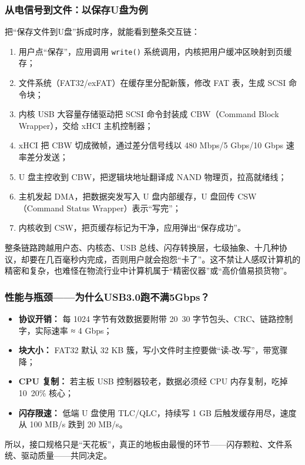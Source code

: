 \subsubsection{从电信号到文件：以保存U盘为例}

把“保存文件到U盘”拆成时序，就能看到整条交互链：
\begin{enumerate}
\item 用户点“保存”，应用调用 \texttt{write()} 系统调用，内核把用户缓冲区映射到页缓存；
\item 文件系统（FAT32/exFAT）在缓存里分配新簇，修改 FAT 表，生成 SCSI 命令块；
\item 内核 USB 大容量存储驱动把 SCSI 命令封装成 CBW（Command Block Wrapper），交给 xHCI 主机控制器；
\item xHCI 把 CBW 切成微帧，通过差分信号线以 480 Mbps/5 Gbps/10 Gbps 速率差分发送；
\item U 盘主控收到 CBW，把逻辑块地址翻译成 NAND 物理页，拉高就绪线；
\item 主机发起 DMA，把数据突发写入 U 盘内部缓存，U 盘回传 CSW（Command Status Wrapper）表示“写完”；
\item 内核收到 CSW，把页缓存标记为干净，应用弹出“保存成功”。
\end{enumerate}
整条链路跨越用户态、内核态、USB 总线、闪存转换层，七级抽象、十几种协议，却要在几百毫秒内完成，否则用户就会抱怨“卡了”。这不禁让人感叹计算机的精密和复杂，也难怪在物流行业中计算机属于“精密仪器”或“高价值易损货物”。

\subsubsection{性能与瓶颈——为什么USB3.0跑不满5Gbps？}
\begin{itemize}
\item \textbf{协议开销：} 每 1024 字节有效数据要附带 20~30 字节包头、CRC、链路控制字，实际速率 ≈ 4 Gbps；
\item \textbf{块大小：} FAT32 默认 32 KB 簇，写小文件时主控要做“读-改-写”，带宽骤降；
\item \textbf{CPU 复制：} 若主板 USB 控制器较老，数据必须经 CPU 内存复制，吃掉 10~20\% 核心；
\item \textbf{闪存限速：} 低端 U 盘使用 TLC/QLC，持续写 1 GB 后触发缓存用尽，速度从 100 MB/s 跌到 20 MB/s。
\end{itemize}
所以，接口规格只是“天花板”，真正的地板由最慢的环节——闪存颗粒、文件系统、驱动质量——共同决定。

